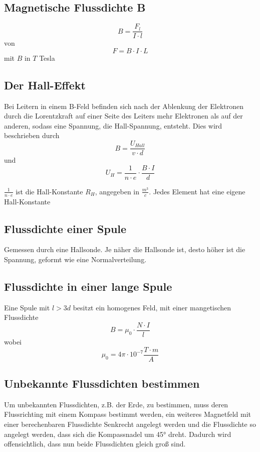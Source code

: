 \documentclass{article}
\begin{document}
\subsection{Magnetische Flussdichte B} 
\[B=\frac{F_l}{I \cdot l}\]
von 
\[F=B \cdot I \cdot L\]
mit $B$ in $T$ Tesla 
 
\subsection{Der Hall-Effekt} 
Bei Leitern in einem B-Feld befinden sich nach der Ablenkung der Elektronen durch die Lorentzkraft auf einer Seite des Leiters mehr Elektronen als auf der anderen, sodass eine Spannung, die Hall-Spannung, entsteht. Dies wird beschrieben durch
\[B=\frac{U_{Hall}}{v \cdot d}\] 
und
\[U_H=\frac{1}{n \cdot e} \cdot \frac{B \cdot I}{d}\] 
 
\noindent $\frac{1}{n \cdot e}$ ist die Hall-Konstante $R_H$, angegeben in $\frac{m^3}{c}$. Jedes Element hat eine eigene Hall-Konstante
 
\subsection{Flussdichte einer Spule}
Gemessen durch eine Hallsonde. Je näher die Hallsonde ist, desto höher ist die Spannung, geformt wie eine Normalverteilung.
 
\subsection{Flussdichte in einer lange Spule}
Eine Spule mit $l>3d$ besitzt ein homogenes Feld, mit einer mangetischen Flussdichte
\[B=\mu_0 \cdot \frac{N \cdot I}{l}\]
wobei
\[\mu_0 = 4\pi \cdot 10^{-7} \frac{T \cdot m}{A}\]
 
\subsection{Unbekannte Flussdichten bestimmen} 
Um unbekannten Flussdichten, z.B. der Erde, zu bestimmen, muss deren Flussrichting mit einem Kompass bestimmt werden, ein weiteres Magnetfeld mit einer berechenbaren Flussdichte Senkrecht angelegt werden und die Flussdichte so angelegt werden, dass sich die Kompassnadel um 45° dreht. Dadurch wird offensichtlich, dass nun beide Flussdichten gleich groß sind.
 
\end{document}
